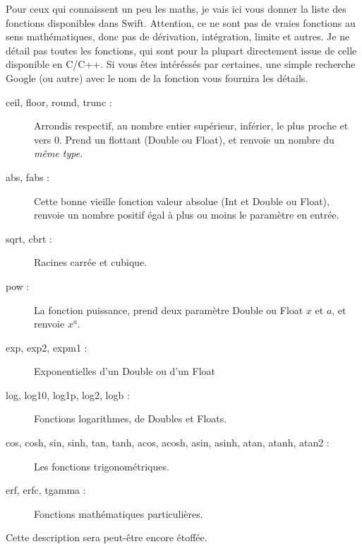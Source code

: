 Pour ceux qui connaissent un peu les maths, je vais ici vous donner la liste des fonctions disponibles dans Swift. Attention, ce ne sont pas de vraies fonctions au sens mathématiques, donc pas de dérivation, intégration, limite et autres.
Je ne détail pas toutes les fonctions, qui sont pour la plupart directement issue de celle disponible en C/C++.
Si vous êtes intéréssés par certaines, une simple recherche Google (ou autre) avec le nom de la fonction vous fournira les détails.
\begin{description}
\item[ceil, floor, round, trunc :] Arrondis respectif, au nombre entier supérieur, inférier, le plus proche et vers 0. Prend un flottant (Double ou Float), et renvoie un nombre du \emph{même type}.
\item[abs, fabs :] Cette bonne vieille fonction valeur absolue (Int et Double ou Float), renvoie un nombre positif égal à plus ou moins le paramètre en entrée.
\item[sqrt, cbrt :] Racines carrée et cubique.
\item[pow :] La fonction puissance, prend deux paramètre Double ou Float $x$ et $a$, et renvoie $x^{a}$. %
\item[exp, exp2, expm1 :] Exponentielles d'un Double ou d'un Float
\item[log, log10, log1p, log2, logb :] Fonctions logarithmes, de Doubles et Floats.
\item[cos, cosh, sin, sinh, tan, tanh, acos, acosh, asin, asinh, atan, atanh, atan2 :] Les fonctions trigonométriques.
\item[erf, erfc, tgamma :] Fonctions mathématiques particulières.
\end{description}
Cette description sera peut-être encore étoffée.
